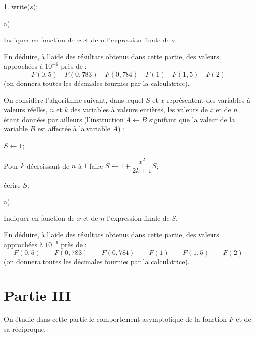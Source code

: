 \documentclass[11pt]{article}%
\begin{document}
\begin{noliste}{1.}
write($s$);

\begin{noliste}{a)}
 \setlength{\itemsep}{2mm}
\item Indiquer en fonction de $x$ et de $n$ l'expression finale de $s$.

\item En déduire, à l'aide des résultats obtenus dans cette partie, des
valeurs approchées à $10^{-6}$ près de : 
\[
F(0,5)\quad F(0,783)\quad F(0,784)\quad F(1)\quad F(1,5)\quad F(2)
\]
(on donnera toutes les décimales fournies par la calculatrice).
\end{noliste}

On considère l'algorithme suivant, dans lequel $S$ et $x$ représentent
des
variables à valeurs réelles, $n$ et $k$ des variables à valeurs
entières,
les valeurs de $x$ et de $n$ étant données par ailleurs (l'instruction
$A\leftarrow B$ signifiant que la valeur de la variable $B$ est
affectée à la
variable $A$) :

$S\leftarrow 1$;

Pour $k$ décroissant de $n$ à $1$ faire $S\leftarrow 1 +
\dfrac{x^{2}}{2k + 1}S$;

écrire $S$;

\item 

\begin{noliste}{a)}
 \setlength{\itemsep}{2mm}
\item Indiquer en fonction de $x$ et de $n$ l'expression finale de $S$.

\item En déduire, à l'aide des résultats obtenus dans cette partie, des
valeurs approchées à $10^{-6}$ près de : 
\[
F(0,5)\quad \quad F(0,783)\quad \quad F(0,784)\quad \quad F(1)\quad
\quad
F(1,5)\quad \quad F(2)
\]
(on donnera toutes les décimales fournies par la calculatrice).
\end{noliste}
\end{noliste}

\section*{Partie III}

On étudie dans cette partie le comportement asymptotique de la fonction
$F$
et de sa réciproque.
\end{document}
